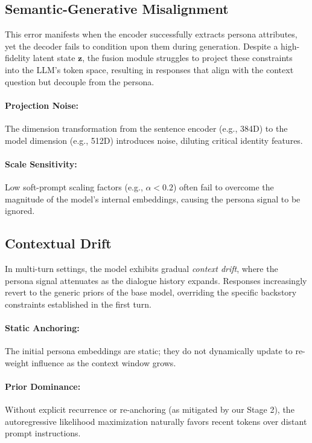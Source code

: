 \subsection{Semantic-Generative Misalignment}
This error manifests when the encoder successfully extracts persona attributes, yet the decoder fails to condition upon them during generation. Despite a high-fidelity latent state $\mathbf{z}$, the fusion module struggles to project these constraints into the LLM's token space, resulting in responses that align with the context question but decouple from the persona.

\paragraph{\textbf{Projection Noise:}} The dimension transformation from the sentence encoder (e.g., 384D) to the model dimension (e.g., 512D) introduces noise, diluting critical identity features.

\paragraph{\textbf{Scale Sensitivity:}} Low soft-prompt scaling factors (e.g., $\alpha < 0.2$) often fail to overcome the magnitude of the model's internal embeddings, causing the persona signal to be ignored.





\subsection{Contextual Drift}
In multi-turn settings, the model exhibits gradual \textit{context drift}, where the persona signal attenuates as the dialogue history expands. Responses increasingly revert to the generic priors of the base model, overriding the specific backstory constraints established in the first turn.

\paragraph{\textbf{Static Anchoring:}} The initial persona embeddings are static; they do not dynamically update to re-weight influence as the context window grows.
\paragraph{\textbf{Prior Dominance:}} Without explicit recurrence or re-anchoring (as mitigated by our Stage 2), the autoregressive likelihood maximization naturally favors recent tokens over distant prompt instructions.






